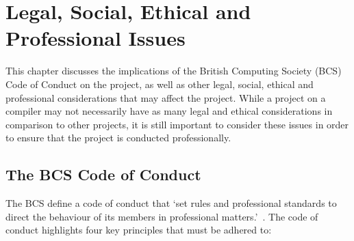 \chapter{Legal, Social, Ethical and Professional Issues}
\label{ch:professional-issues}

This chapter discusses the implications of the British Computing Society (BCS) Code of Conduct on
the project, as well as other legal, social, ethical and professional considerations that may affect
the project. While a project on a compiler may not necessarily have as many legal and ethical
considerations in comparison to other projects, it is still important to consider these issues in
order to ensure that the project is conducted professionally.

\section{The BCS Code of Conduct}

The BCS define a code of conduct that `set rules and professional standards to direct the behaviour
of its members in professional matters.'~\autocite{bcs}. The code of conduct highlights four key
principles that must be adhered to:


